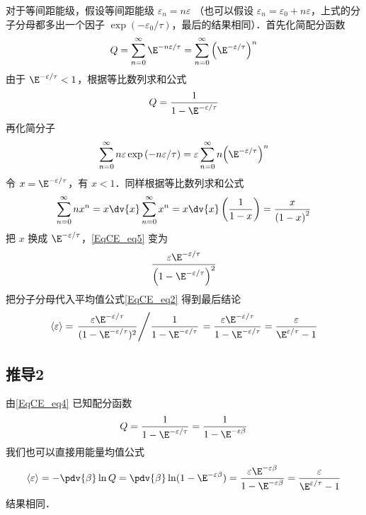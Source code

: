对于等间距能级，假设等间距能级 ${\varepsilon _n} = n\varepsilon$ （也可以假设 ${\varepsilon _n} = {\varepsilon _0} + n\varepsilon $，上式的分子分母都多出一个因子 $\exp ( - {\varepsilon _0}/\tau )$，最后的结果相同）．首先化简配分函数
\begin{equation}
Q = \sum\limits_{n = 0}^\infty  {{\E^{ - n\varepsilon /\tau }}}  = \sum\limits_{n = 0}^\infty  {{{\left( {{\E^{ - \varepsilon /\tau }}} \right)}^n}} 
\end{equation}
由于 ${\E^{ - \varepsilon /\tau }} < 1$，根据等比数列求和公式 %
\begin{equation}\label{EqCE_eq4}
Q = \frac{1}{{1 - {\E^{ - \varepsilon /\tau }}}}
\end{equation}
再化简分子
\begin{equation}\label{EqCE_eq5}
\sum\limits_{n = 0}^\infty  {n\varepsilon \exp \left( { - n\varepsilon /\tau } \right)}  = \varepsilon \sum\limits_{n = 0}^\infty  {n{{\left( {{\E^{ - \varepsilon /\tau }}} \right)}^n}}
\end{equation}
令 $x = {\E^{ - \varepsilon /\tau }}$，有 $x < 1$．同样根据等比数列求和公式
\begin{equation}
\sum\limits_{n = 0}^\infty  {n{x^n}}  = x\dv{x}\sum\limits_{n = 0}^\infty  {{x^n}}  = x\dv{x}\left( {\frac{1}{{1 - x}}} \right) = \frac{x}{{{{\left( {1 - x} \right)}^2}}}
\end{equation}
把 $x$ 换成 ${\E^{ - \varepsilon /\tau }}$，\autoref{EqCE_eq5} 变为
\begin{equation}
\frac{{\varepsilon {\E^{ - \varepsilon /\tau }}}}{{{{\left( {1 - {\E^{ - \varepsilon /\tau }}} \right)}^2}}}
\end{equation}
把分子分母代入平均值公式\autoref{EqCE_eq2} 得到最后结论
\begin{equation}
\langle \varepsilon \rangle = \left. \frac{\varepsilon \E^{-\varepsilon/\tau}}{(1 - \E^{-\varepsilon /\tau})^2} \middle/ \frac{1}{1 - \E^{-\varepsilon/\tau}}  \right. = \frac{\varepsilon \E^{-\varepsilon/\tau}}{1 - \E^{-\varepsilon/\tau}} = \frac{\varepsilon}{\E^{\varepsilon/\tau} - 1}
\end{equation}

\subsection{推导2}
由\autoref{EqCE_eq4} 已知配分函数
\begin{equation}
Q = \frac{1}{{1 - {\E^{ - \varepsilon /\tau }}}} = \frac{1}{{1 - {\E^{ - \varepsilon\beta }}}}
\end{equation}
我们也可以直接用能量均值公式
\begin{equation}
\langle\varepsilon\rangle = -\pdv{\beta} \ln Q
= \pdv{\beta} \ln (1 - {\E^{ - \varepsilon \beta }}) = \frac{{\varepsilon {\E^{ - \varepsilon \beta }}}}{{1 - {\E^{ - \varepsilon \beta }}}} = \frac{\varepsilon }{{{\E^{\varepsilon /\tau }} - 1}}
\end{equation}
结果相同．

